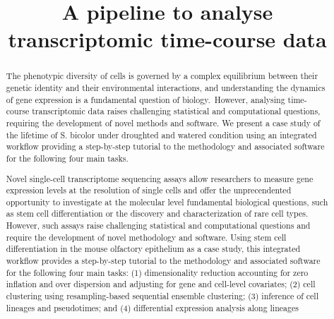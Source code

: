 \documentclass[11 pts]{article}
\begin{document}
\title{A pipeline to analyse transcriptomic time-course data}
\maketitle


\begin{abstract}

The phenotypic diversity of cells is governed by a complex equilibrium between
their genetic identity and their environmental interactions, and understanding
the dynamics of gene expression is a fundamental question of biology. However,
analysing time-course transcriptomic data raises challenging statistical and
computational questions, requiring the development of novel methods and
software. We present a case study of the lifetime of S. bicolor under
droughted and watered condition using an integrated workflow providing a
step-by-step tutorial to the methodology and associated software for the
following four main tasks.

Novel single-cell transcriptome sequencing assays allow researchers to measure
gene expression levels at the resolution of single cells and offer the
unprecendented opportunity to investigate at the molecular level fundamental
biological questions, such as stem cell differentiation or the discovery and
characterization of rare cell types. However, such assays raise challenging
statistical and computational questions and require the development of novel
methodology and software. Using stem cell differentiation in the mouse
olfactory epithelium as a case study, this integrated workflow provides a
step-by-step tutorial to the methodology and associated software for the
following four main tasks: (1) dimensionality reduction accounting for zero
inflation and over dispersion and adjusting for gene and cell-level
covariates; (2) cell clustering using resampling-based sequential ensemble
clustering; (3) inference of cell lineages and pseudotimes; and (4)
differential expression analysis along lineages
\end{abstract}
\end{document}
